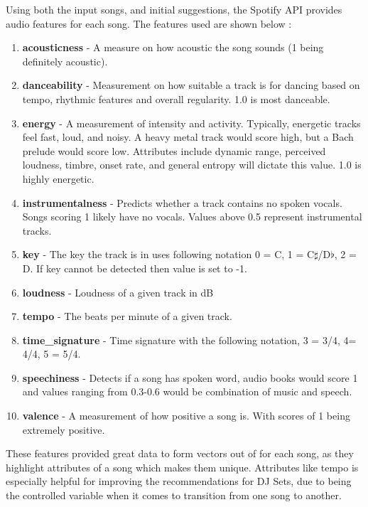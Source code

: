 Using both the input songs, and initial suggestions, the Spotify API provides audio features for each song. The features used are shown below \citep{spotify_web_2023}:

\begin{enumerate}
	\item \textbf{acousticness} - A measure on how acoustic the song sounds (1 being definitely acoustic).
	\item \textbf{danceability} - Measurement on how suitable a track is for dancing based on tempo, rhythmic features and overall regularity. 1.0 is most danceable. 
	\item \textbf{energy} - A measurement of intensity and activity. Typically, energetic tracks feel fast, loud, and noisy. A heavy metal track would score high, but a Bach prelude would score low. Attributes include dynamic range, perceived loudness, timbre, onset rate, and general entropy will dictate this value. 1.0 is highly energetic.
	\item \textbf{instrumentalness} - Predicts whether a track contains no spoken vocals. Songs scoring 1 likely have no vocals. Values above 0.5 represent instrumental tracks.
	\item \textbf{key} - The key the track is in uses following notation 0 = C, 1 = C$\sharp$/D$\flat$, 2 = D. If key cannot be detected then value is set to -1.
	\item \textbf{loudness} - Loudness of a given track in dB
	\item \textbf{tempo} - The beats per minute of a given track.
	\item \textbf{time\_signature} - Time signature with the following notation, 3 = 3/4, 4= 4/4, 5 = 5/4.
	\item \textbf{speechiness} - Detects if a song has spoken word, audio books would score 1 and values ranging from 0.3-0.6 would be combination of music and speech.
	\item \textbf{valence} - A measurement of how positive a song is. With scores of 1 being extremely positive.
	
\end{enumerate}

These features provided great data to form vectors out of for each song, as they highlight attributes of a song which makes them unique. Attributes like tempo is especially helpful for improving the recommendations for DJ Sets, due to being the controlled variable when it comes to transition from one song to another.

